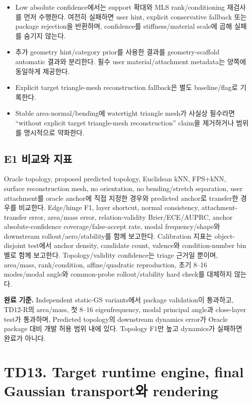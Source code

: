 \documentclass[10pt,a4paper]{article}
\newcommand{\todo}{\textcolor{TodoGray}{\(\square\)}}
\begin{document}
\begin{itemize}
  \item[\todo] Low absolute confidence에서는 support 확대와 MLS rank/conditioning 재검사를 먼저 수행한다.
  여전히 실패하면 user hint, explicit conservative fallback 또는 package rejection을 반환하며,
  confidence를 stiffness/material scale에 곱해 실패를 숨기지 않는다.
  \item[\todo] 추가 geometry hint/category prior를 사용한 결과를 geometry-scaffold automatic 결과와 분리한다. 필수 user material/attachment metadata는 양쪽에 동일하게 제공한다.
  \item[\todo] Explicit target triangle-mesh reconstruction fallback은 별도 baseline/flag로 기록한다.
  \item[\todo] Stable area-normal/bending에 watertight triangle mesh가 사실상 필수라면 ``without explicit target triangle-mesh reconstruction'' claim을 제거하거나 범위를 명시적으로 약화한다.
\end{itemize}

\subsection*{E1 비교와 지표}

Oracle topology, proposed predicted topology, Euclidean kNN, FPS+kNN,
surface reconstruction mesh, no orientation, no bending/stretch separation,
user attachment를 oracle anchor에 직접 지정한 경우와 predicted anchor로 transfer한 경우를 비교한다.
Edge/hinge F1, layer shortcut, normal consistency, attachment-transfer error, area/mass error,
relation-validity Brier/ECE/AUPRC, anchor absolute-confidence coverage/false-accept rate,
modal frequency/shape와 downstream rollout/aero/stability를 함께 보고한다.
Calibration 지표는 object-disjoint test에서 anchor density, candidate count, valence와
condition-number bin별로 함께 보고한다. Topology/validity confidence는 triage 근거일 뿐이며,
area/mass, rank/condition, affine/quadratic reproduction, 초기 8--16 modes/modal angle와
common-probe rollout/stability hard check를 대체하지 않는다.

\textbf{완료 기준.}
Independent static-GS variants에서 package validation이 통과하고,
TD12-R의 area/mass, 첫 8--16 eigenfrequency, modal principal angle과 close-layer test가 통과하며,
Predicted topology의 downstream dynamics error가 Oracle package 대비 개발 허용 범위 내에 있다.
Topology F1만 높고 dynamics가 실패하면 완료가 아니다.

\section{TD13. Target runtime engine, final Gaussian transport와 rendering}
\end{document}
